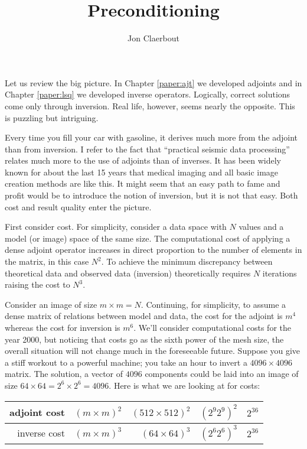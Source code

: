 
\def\sx#1{}
\def\bx#1{#1}
\def\eq{\quad =\quad}

\title{Preconditioning}
\author{Jon Claerbout}
\maketitle

\label{paper:prc}
\sx{precondition}


\par
Let us review the big picture.
In Chapter \ref{paper:ajt} we developed adjoints and
in Chapter \ref{paper:lsq} we developed inverse operators.
Logically, correct solutions come only through inversion.
Real life, however, seems nearly the opposite.
This is puzzling but intriguing.
\par
Every time you fill your car with gasoline,
it derives much more from the adjoint than from inversion.
I refer to the fact that ``practical seismic data processing''
relates much more to the use of adjoints than of inverses.
It has been widely known for about the last 15 years
that medical imaging and all basic image creation methods are like this.
It might seem that an easy path to fame and profit would
be to introduce the notion of inversion,
but it is not that easy.
Both cost and result quality enter the picture.
\par
First consider cost.
For simplicity, consider a data space with $N$ values
and a model (or image) space of the same size.
The computational cost of applying a dense adjoint
operator increases in direct proportion to the number
of elements in the matrix, in this case $N^2$.
To achieve the minimum discrepancy between theoretical data
and observed data (inversion) theoretically requires $N$ iterations
raising the cost to $N^3$.
\par
Consider an image of size $m\times m=N$.
Continuing, for simplicity, to assume a dense matrix of relations between
model and data,
the cost for the adjoint is $m^4$ whereas the cost for inversion is $m^6$.
We'll consider computational costs for the year 2000, but
noticing that costs go as the sixth power of the mesh size,
the overall situation will not change much in the foreseeable future.
Suppose you give a stiff workout to a powerful machine;
you take an hour to invert a $4096\times 4096$ matrix.
The solution, a vector of $4096$ components could
be laid into an image of size $64\times 64= 2^6\times 2^6 = 4096$.
Here is what we are looking at for costs:
\par
\begin{center}
\begin{tabular}{||r|r|r|r|r||}                                          \hline
adjoint cost &$(m\times m )^2$ & $(512\times 512)^2$ & $(2^9 2^9)^2$ & $2^{36}$
\\ \hline
inverse cost &$(m\times m )^3$ & $  (64\times 64)^3$ & $(2^6 2^6)^3$ & $2^{36}$
\\ \hline
\end{tabular}
\end{center}
